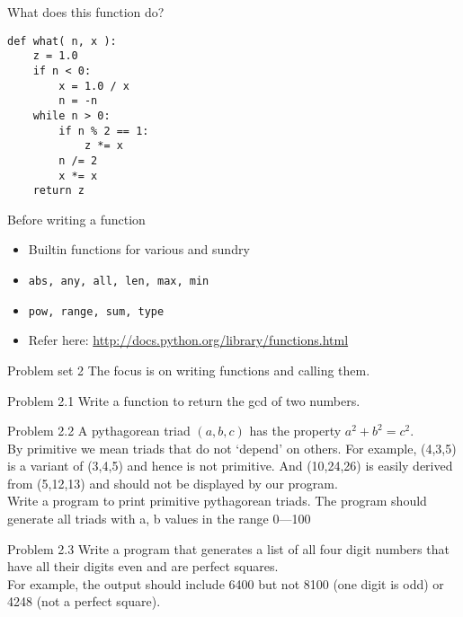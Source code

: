 \documentclass[14pt,compress]{beamer}
\newcounter{time}
\newcommand{\inctime}[1]{\addtocounter{time}{#1}{\tiny \thetime\ m}}
\newcommand{\typ}[1]{\texttt{#1}}
\begin{document}
\begin{frame}[fragile]
  {What does this function do?}
  \begin{lstlisting}
def what( n, x ):
    z = 1.0
    if n < 0:
        x = 1.0 / x
        n = -n
    while n > 0:
        if n % 2 == 1:
            z *= x
        n /= 2
        x *= x
    return z
  \end{lstlisting}
\end{frame}

\begin{frame}
  {Before writing a function}
  \begin{itemize}
      \item Builtin functions for various and sundry
      \item \typ{abs, any, all, len, max, min}
      \item \typ{pow, range, sum, type}
      \item Refer here:
          \url{http://docs.python.org/library/functions.html}
  \end{itemize}
  \inctime{10} 
\end{frame}

\begin{frame}{Problem set 2}
  The focus is on writing functions and calling them.
\end{frame}

\begin{frame}{Problem 2.1}
  Write a function to return the gcd of two numbers.
\end{frame}

\begin{frame}{Problem 2.2}
A pythagorean triad $(a,b,c)$ has the property $a^2 + b^2 = c^2$.\\By primitive we mean triads that do not `depend' on others. For example, (4,3,5) is a variant of (3,4,5) and hence is not primitive. And (10,24,26) is easily derived from (5,12,13) and should not be displayed by our program. \\
Write a program to print primitive pythagorean triads. The program should generate all triads with a, b values in the range 0---100
\end{frame}

\begin{frame}{Problem 2.3}
  Write a program that generates a list of all four digit numbers that have all their digits even and are perfect squares.\\For example, the output should include 6400 but not 8100 (one digit is odd) or 4248 (not a perfect square).
\end{frame}
\end{document}
